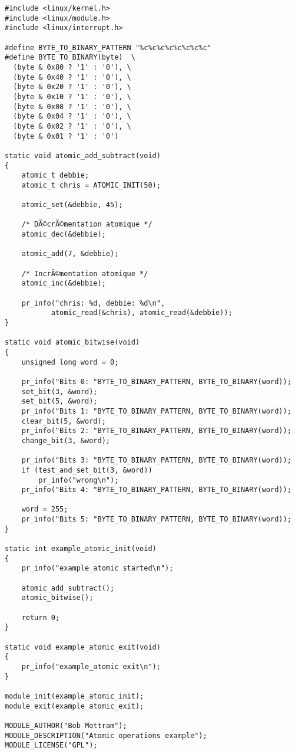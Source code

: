 \documentclass[11pt]{article}
\begin{document}
\begin{verbatim}
#include <linux/kernel.h>
#include <linux/module.h>
#include <linux/interrupt.h>

#define BYTE_TO_BINARY_PATTERN "%c%c%c%c%c%c%c%c"
#define BYTE_TO_BINARY(byte)  \
  (byte & 0x80 ? '1' : '0'), \
  (byte & 0x40 ? '1' : '0'), \
  (byte & 0x20 ? '1' : '0'), \
  (byte & 0x10 ? '1' : '0'), \
  (byte & 0x08 ? '1' : '0'), \
  (byte & 0x04 ? '1' : '0'), \
  (byte & 0x02 ? '1' : '0'), \
  (byte & 0x01 ? '1' : '0')

static void atomic_add_subtract(void)
{
    atomic_t debbie;
    atomic_t chris = ATOMIC_INIT(50);

    atomic_set(&debbie, 45);

    /* DÃ©crÃ©mentation atomique */
    atomic_dec(&debbie);

    atomic_add(7, &debbie);

    /* IncrÃ©mentation atomique */
    atomic_inc(&debbie);

    pr_info("chris: %d, debbie: %d\n",
           atomic_read(&chris), atomic_read(&debbie));
}

static void atomic_bitwise(void)
{
    unsigned long word = 0;

    pr_info("Bits 0: "BYTE_TO_BINARY_PATTERN, BYTE_TO_BINARY(word));
    set_bit(3, &word);
    set_bit(5, &word);
    pr_info("Bits 1: "BYTE_TO_BINARY_PATTERN, BYTE_TO_BINARY(word));
    clear_bit(5, &word);
    pr_info("Bits 2: "BYTE_TO_BINARY_PATTERN, BYTE_TO_BINARY(word));
    change_bit(3, &word);

    pr_info("Bits 3: "BYTE_TO_BINARY_PATTERN, BYTE_TO_BINARY(word));
    if (test_and_set_bit(3, &word))
        pr_info("wrong\n");
    pr_info("Bits 4: "BYTE_TO_BINARY_PATTERN, BYTE_TO_BINARY(word));

    word = 255;
    pr_info("Bits 5: "BYTE_TO_BINARY_PATTERN, BYTE_TO_BINARY(word));
}

static int example_atomic_init(void)
{
    pr_info("example_atomic started\n");

    atomic_add_subtract();
    atomic_bitwise();

    return 0;
}

static void example_atomic_exit(void)
{
    pr_info("example_atomic exit\n");
}

module_init(example_atomic_init);
module_exit(example_atomic_exit);

MODULE_AUTHOR("Bob Mottram");
MODULE_DESCRIPTION("Atomic operations example");
MODULE_LICENSE("GPL");
\end{verbatim}
\end{document}
